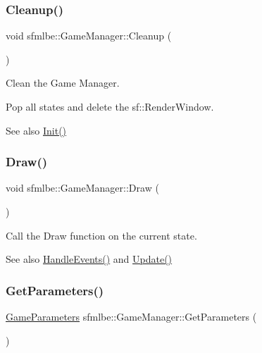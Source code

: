 \subsubsection{\texorpdfstring{Cleanup()}{Cleanup()}}
{\footnotesize\ttfamily void sfmlbe\+::\+Game\+Manager\+::\+Cleanup (\begin{DoxyParamCaption}{ }\end{DoxyParamCaption})}



Clean the Game Manager. 

Pop all states and delete the sf\+::\+Render\+Window. \begin{DoxySeeAlso}{See also}
\mbox{\hyperlink{classsfmlbe_1_1_game_manager_a120f841a7f3cb2dfe21b78984c3e83bf}{Init()}} 
\end{DoxySeeAlso}
\mbox{\label{classsfmlbe_1_1_game_manager_a6c8377c22718038d018ebe7e26d3bdc3}} 
\subsubsection{\texorpdfstring{Draw()}{Draw()}}
{\footnotesize\ttfamily void sfmlbe\+::\+Game\+Manager\+::\+Draw (\begin{DoxyParamCaption}{ }\end{DoxyParamCaption})}



Call the Draw function on the current state. 

\begin{DoxySeeAlso}{See also}
\mbox{\hyperlink{classsfmlbe_1_1_game_manager_a0fd18d663571814d08d14e6c1ed3191a}{Handle\+Events()}} and \mbox{\hyperlink{classsfmlbe_1_1_game_manager_a895a0457b48b9ccd36194a345b04b547}{Update()}} 
\end{DoxySeeAlso}
\mbox{\label{classsfmlbe_1_1_game_manager_a53239ca0e97052fc512ab973102ca6cb}} 
\subsubsection{\texorpdfstring{Get\+Parameters()}{GetParameters()}}
{\footnotesize\ttfamily \mbox{\hyperlink{structsfmlbe_1_1_game_parameters}{Game\+Parameters}} sfmlbe\+::\+Game\+Manager\+::\+Get\+Parameters (\begin{DoxyParamCaption}{ }\end{DoxyParamCaption})\hspace{0.3cm}{\ttfamily [inline]}}



